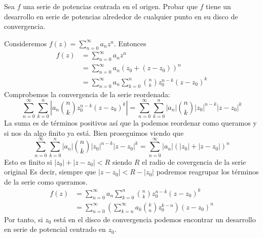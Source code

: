 \documentclass[twoside]{article}
\begin{document}
\newpage
\begin{ejercicio}{2}
Sea $f$ una serie de potencias centrada en el origen. Probar que $f$ tiene un desarrollo en serie de potencias alrededor de cualquier punto en su disco de convergencia.
\end{ejercicio}
\begin{solucion}
Consideremos $f(z)=\sum_{n=0}^\infty a_n z^n$. Entonces
\begin{align*}
f(z)&=\sum_{n=0}^\infty a_n z^n \\
&= \sum_{n=0}^\infty a_n (z_0 + (z-z_0))^n\\
&= \sum_{n=0}^\infty a_n \sum_{k=0}^n\binom{n}{k}z_0^{n-k}(z-z_0)^k
\end{align*}
Comprobemos la convergencia de la serie reordenada:
$$\sum_{n=0}^\infty \sum_{k=0}^n | a_n \binom{n}{k} z_0^{n-k} (z-z_0)^k | =
\sum_{n=0}^\infty \sum_{k=0}^n |a_n| \binom{n}{k} |z_0|^{n-k} |z-z_0|^k $$
La suma es de términos positivos así que la podemos reordenar como queramos y si nos da algo finito ya está.  Bien proseguimos viendo que
$$\sum_{n=0}^\infty \sum_{k=0}^n |a_n| \binom{n}{k} |z_0|^{n-k} |z-z_0|^k =
\sum_{n=0}^\infty  |a_n| (|z_0|+|z-z_0|)^n$$
Esto es finito si $|z_0|+|z-z_0| < R$ siendo $R$ el radio de covergencia de la serie original
Es decir, siempre que $|z-z_0|<R-|z_0|$ podremos reagrupar los términos de la serie como queramos.
\begin{align*}
f(z)&=\sum_{n=0}^\infty a_n \sum_{k=0}^n\binom{n}{k}z_0^{n-k}(z-z_0)^k\\
&=\sum_{n=0}^\infty \left(\sum_{k=n}^\infty a_k \binom{k}{n}z_0^{k-n}\right) (z-z_0)^n
\end{align*}
Por tanto, si $z_0$ está en el disco de convergencia podemos encontrar un desarrollo en serie de potencial centrado en $z_0$.
\end{solucion}
\newpage
\end{document}
